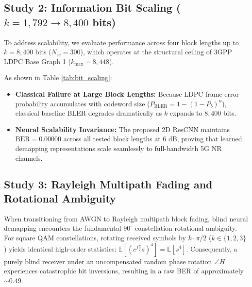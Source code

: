 \documentclass[journal]{IEEEtran}
\begin{document}
\subsection{Study 2: Information Bit Scaling ($k=1,792 \to 8,400$ bits)}
To address scalability, we evaluate performance across four block lengths up to $k=8,400$ bits ($N_{\text{sc}}=300$), which operates at the structural ceiling of 3GPP LDPC Base Graph 1 ($k_{\max} = 8,448$).

As shown in Table \ref{tab:bit_scaling}:
\begin{itemize}
    \item \textbf{Classical Failure at Large Block Lengths:} Because LDPC frame error probability accumulates with codeword size ($P_{\text{BLER}} = 1 - (1 - P_b)^n$), classical baseline BLER degrades dramatically as $k$ expands to $8,400$ bits.
    \item \textbf{Neural Scalability Invariance:} The proposed 2D ResCNN maintains $\text{BER} = 0.00000$ across all tested block lengths at $6\text{ dB}$, proving that learned demapping representations scale seamlessly to full-bandwidth 5G NR channels.
\end{itemize}

\subsection{Study 3: Rayleigh Multipath Fading and Rotational Ambiguity}
When transitioning from AWGN to Rayleigh multipath block fading, blind neural demapping encounters the fundamental $90^\circ$ constellation rotational ambiguity. For square QAM constellations, rotating received symbols by $k \cdot \pi/2$ ($k \in \{1, 2, 3\}$) yields identical high-order statistics: $\mathbb{E}[(e^{j \frac{\pi}{2}} s)^4] = \mathbb{E}[s^4]$. Consequently, a purely blind receiver under an uncompensated random phase rotation $\angle H$ experiences catastrophic bit inversions, resulting in a raw BER of approximately $\sim 0.49$.

\begin{table}[!t]
\caption{Rayleigh Fading Demapper Comparison ($k=1,792$ bits)}
\label{tab:rayleigh_ambiguity}
\centering
{}
\end{table}
\end{document}
